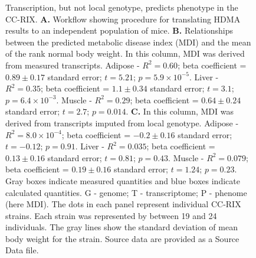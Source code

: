 \documentclass[
]{article}
\begin{document}
\begin{figure}[ht!]
\caption{Transcription, but not local genotype, predicts 
phenotype in the CC-RIX. \textbf{A.} Workflow showing 
procedure for translating HDMA results to an independent 
population of mice. \textbf{B.} Relationships between the 
predicted metabolic disease index (MDI) and the mean
of the rank normal body weight. In this column,
MDI was derived from measured transcripts. Adipose - 
$R^2 = 0.60$;  beta coefficient = $0.89\pm0.17$ 
standard error; $t = 5.21$; $p = 5.9\times10^{-5}$.
Liver - $R^2 = 0.35$;  beta coefficient = $1.1\pm0.34$ 
standard error; $t = 3.1$; $p = 6.4\times10^{-3}$.
Muscle - $R^2 = 0.29$;  beta coefficient = $0.64\pm0.24$ 
standard error; $t = 2.7$; $p = 0.014$.
\textbf{C.} In this column, MDI was derived from 
transcripts imputed from local genotype. Adipose - 
$R^2 = 8.0\times10^{-4}$;  beta coefficient = $-0.2\pm0.16$ 
standard error; $t = -0.12$; $p = 0.91$.
Liver - $R^2 = 0.035$;  beta coefficient = $0.13\pm0.16$ 
standard error; $t = 0.81$; $p = 0.43$.
Muscle - $R^2 = 0.079$;  beta coefficient = $0.19\pm0.16$ 
standard error; $t = 1.24$; $p = 0.23$.
Gray boxes indicate measured quantities and blue boxes 
indicate calculated quantities. G - genome; T - transcriptome; 
P - phenome (here MDI). The dots in each panel represent 
individual CC-RIX strains. Each strain was represented 
by between 19 and 24 individuals. The gray lines show 
the standard deviation of mean body weight for the 
strain. Source data are provided as a Source Data 
file.
}
\label{fig:cc_prediction}
\end{figure}
\end{document}
